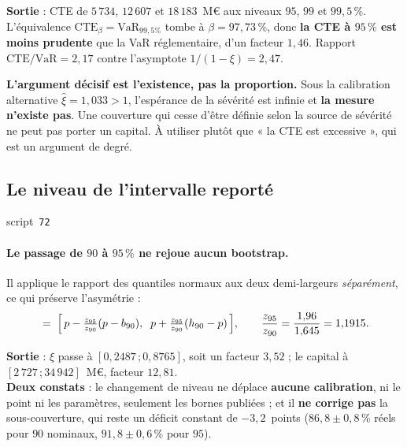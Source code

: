 \documentclass[11pt,a4paper]{article}
\newcommand{\src}[1]{\hfill{\footnotesize\textsf{script~\texttt{#1}}}}
\begin{document}
\begin{res}
\textbf{Sortie} : CTE de $5\,734$, $12\,607$ et $18\,183$~M\euro{} aux niveaux $95$, $99$ et
$99{,}5\,\%$. L'équivalence $\mathrm{CTE}_\beta = \mathrm{VaR}_{99,5\%}$ tombe à
$\beta = 97{,}73\,\%$, donc \textbf{la CTE à $95\,\%$ est moins prudente} que la VaR
réglementaire, d'un facteur $1{,}46$. Rapport $\mathrm{CTE}/\mathrm{VaR} = 2{,}17$ contre
l'asymptote $1/(1-\xi) = 2{,}47$.
\end{res}

\begin{cle}
\textbf{L'argument décisif est l'existence, pas la proportion.} Sous la calibration alternative
$\hat\xi = 1{,}033 > 1$, l'espérance de la sévérité est infinie et \textbf{la mesure n'existe
pas}. Une couverture qui cesse d'être définie selon la source de sévérité ne peut pas porter un
capital. À utiliser plutôt que « la CTE est excessive », qui est un argument de degré.
\end{cle}

\subsection*{Le niveau de l'intervalle reporté}
\src{\texttt{72}}

\paragraph{Le passage de $90$ à $95\,\%$ ne rejoue aucun bootstrap.} Il applique le rapport des
quantiles normaux aux deux demi-largeurs \emph{séparément}, ce qui préserve l'asymétrie :
\begin{equation}
[\,b_{95},\,h_{95}\,] \;=\;
\Bigl[\, p - \tfrac{z_{95}}{z_{90}}(p - b_{90}),\;\; p + \tfrac{z_{95}}{z_{90}}(h_{90} - p) \,\Bigr],
\qquad \frac{z_{95}}{z_{90}} = \frac{1{,}96}{1{,}645} = 1{,}1915.
\end{equation}

\begin{res}
\textbf{Sortie} : $\xi$ passe à $[0{,}2487\,;0{,}8765]$, soit un facteur $3{,}52$ ; le capital à
$[2\,727\,;34\,942]$~M\euro, facteur $12{,}81$.\\
\textbf{Deux constats} : le changement de niveau ne déplace \textbf{aucune calibration}, ni le
point ni les paramètres, seulement les bornes publiées ; et il \textbf{ne corrige pas} la
sous-couverture, qui reste un déficit constant de $-3{,}2$~points ($86{,}8 \pm 0{,}8\,\%$ réels
pour $90$ nominaux, $91{,}8 \pm 0{,}6\,\%$ pour $95$).
\end{res}
\end{document}
